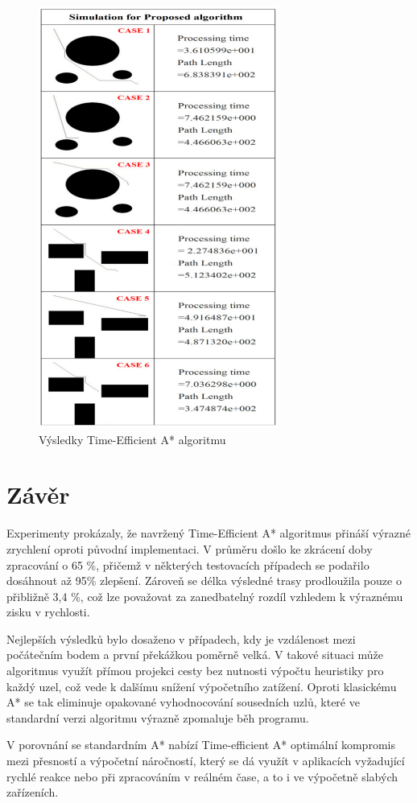 \documentclass[10pt, a4paper]{article}
\begin{document}
\begin{figure}[H]
\centering
\includegraphics[width=0.7\textwidth]{images/proposed_astar.png}
\caption{Výsledky Time-Efficient A* algoritmu}
\label{fig:astar_te}
\end{figure}

\newpage
\section{Závěr}
Experimenty prokázaly, že navržený Time-Efficient A* algoritmus přináší výrazné zrychlení oproti původní implementaci.
V průměru došlo ke zkrácení doby zpracování o 65 \%, přičemž v některých testovacích případech se podařilo dosáhnout až 95\% zlepšení.
Zároveň se délka výsledné trasy prodloužila pouze o přibližně 3,4 \%, což lze považovat za zanedbatelný rozdíl vzhledem k výraznému zisku v rychlosti.

Nejlepších výsledků bylo dosaženo v případech, kdy je vzdálenost mezi počátečním bodem a první překážkou poměrně velká.
V takové situaci může algoritmus využít přímou projekci cesty bez nutnosti výpočtu heuristiky pro každý uzel, což vede k dalšímu snížení výpočetního zatížení.
Oproti klasickému A* se tak eliminuje opakované vyhodnocování sousedních uzlů, které ve standardní verzi algoritmu výrazně zpomaluje běh programu.

V porovnání se standardním A* nabízí Time-efficient A* optimální kompromis mezi přesností a výpočetní náročností, který se dá využít v aplikacích vyžadující rychlé reakce nebo při zpracováním v reálném čase, a to i ve výpočetně slabých zařízeních.

\newpage


\end{document}

